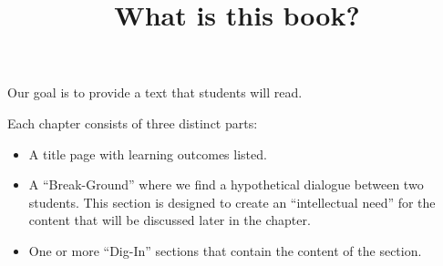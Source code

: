 \documentclass{ximera}
\title[Dig-In:]{What is this book?}
\begin{document}
\begin{abstract}
\end{abstract}
\maketitle

Our goal is to provide a text that students will read.

Each chapter consists of three distinct parts:
\begin{itemize}
\item A title page with learning outcomes listed.
\item A ``Break-Ground'' where we find a hypothetical dialogue between
  two students. This section is designed to create an ``intellectual
  need'' for the content that will be discussed later in the chapter.
\item One or more ``Dig-In'' sections that contain the content of the
  section.
\end{itemize}
\end{document}
